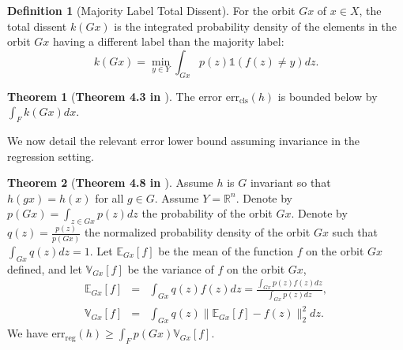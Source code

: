 \documentclass[10pt]{article} %
\newenvironment{customthm}[1][]
{%
    \begin{thm}[\normalfont\textbf{#1}] %
}
{%
    \end{thm}
}
\theoremstyle{definition}
\newtheorem{thm}{Theorem}
\newtheorem{defn}{Definition}
\begin{document}
\begin{defn}[Majority Label Total Dissent]
For the orbit $Gx$ of $x \in X$, the total dissent $k(Gx)$ is the integrated probability density of the elements in the orbit $Gx$ having a different label than the majority label:
%
\begin{equation*}
    k(Gx) = \underset{y \in Y}{\min}\int_{Gx}p(z)\mathds{1}(f(z) \neq y)dz.
\end{equation*}
\end{defn}

\begin{customthm}[Theorem 4.3 in \cite{wang2024general}] \label{thm:cls_lwr} The error
$\text{err}_{\text{cls}}(h)$ is bounded below by $\int_F k(Gx)dx$.
\end{customthm}

We now detail the relevant error lower bound assuming invariance in the regression setting.

\begin{customthm}[Theorem 4.8 in \cite{wang2024general}] \label{thm:invreg}
 Assume $h$ is $G$ invariant so that $h(gx) = h(x)$ for all $g \in G$. Assume $Y = \mathbb{R}^n$. Denote by $p(Gx) = \int_{z \in Gx}p(z)dz$  the probability of the orbit $Gx$. Denote by $q(z) = \frac{p(z)}{p(Gx)}$ the normalized probability density of the orbit $Gx$ such that $\int_{Gx}q(z)dz = 1$. Let $\mathbb{E}_{Gx}[f]$ be the mean of the function $f$ on the orbit $Gx$ defined, and let $\mathbb{V}_{Gx}[f]$ be the variance of $f$ on the orbit $Gx$,
%
\begin{eqnarray*}
\mathbb{E}_{Gx}[f] &=& \int_{Gx}q(z)f(z)dz = \frac{\int_{Gx}p(z)f(z)dz}{\int_{Gx}p(z)dz}, \\
\mathbb{V}_{Gx}[f] &=& \int_{Gx}q(z) \lVert \mathbb{E}_{Gx}[f] - f(z) \rVert_2^2dz.
\end{eqnarray*}
%
We have $\text{err}_{\text{reg}}(h) \geq \int_F p(Gx)\mathbb{V}_{Gx}[f]$.

\end{customthm}
\end{document}
